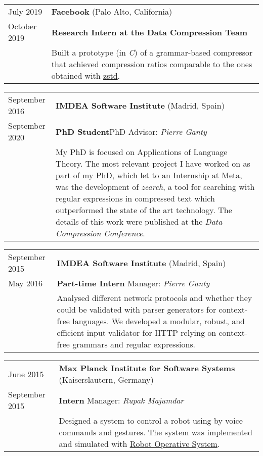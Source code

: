 \documentclass[a4paper,10pt]{article} %
\begin{document}
\begin{tabular}{p{2.5cm}p{13.2cm}}
{\small July 2019} & \textbf{Facebook} (Palo Alto, California) \\
{\small October 2019} & \textcolor{azureblue}{\textbf{Research Intern at the Data Compression Team}} \\
& Built a prototype (in \emph{C}) of a grammar-based compressor that achieved compression ratios comparable to the ones obtained with \href{https://facebook.github.io/zstd/}{zstd}.
\end{tabular}

\begin{tabular}{p{2.5cm}p{13.2cm}}
{\small September 2016} & \textbf{IMDEA Software Institute} (Madrid, Spain) \\
{\small September 2020} & \textcolor{azureblue}{\textbf{PhD Student}}\hfill PhD Advisor: \emph{Pierre Ganty}\\

& My PhD is focused on Applications of Language Theory.
The most relevant project I have worked on as part of my PhD, which let to an Internship at Meta, was the development of \emph{zearch}, a tool
for searching with regular expressions in compressed text which outperformed the state of the art technology.
The details of this work were published at the \emph{Data Compression Conference}. \\
\end{tabular}

\begin{tabular}{p{2.5cm}p{13.2cm}}
{\small September 2015} & \textbf{IMDEA Software Institute} (Madrid, Spain) \\
{\small May 2016} & \textcolor{azureblue}{\textbf{Part-time Intern}} \hfill Manager: \emph{Pierre Ganty} \\
& Analysed different network protocols and whether they could be validated with parser generators for context-free languages.
We developed a modular, robust, and efficient input validator for HTTP relying on context-free grammars and regular expressions.
\end{tabular}

\begin{tabular}{p{2.5cm}p{13.2cm}}
{\small June 2015} & \textbf{Max Planck Institute for Software Systems} (Kaiserslautern, Germany) \\
{\small September 2015} & \textcolor{azureblue}{\textbf{Intern}} \hfill Manager: \emph{Rupak Majumdar} \\
& Designed a system to control a robot using by voice commands and gestures. The system was implemented and simulated with \href{https://www.ros.org/}{Robot Operative System}.
\end{tabular}
\end{document}
